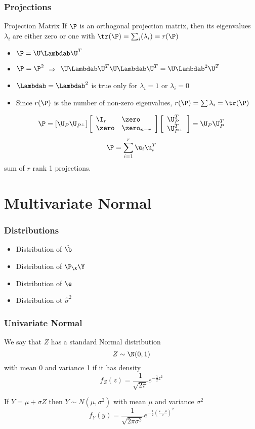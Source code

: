 \documentclass[handout]{beamer}
\begin{document}
\begin{frame}
  \frametitle{Projections}
\begin{block}{Projection Matrix}
If $\P$ is an orthogonal projection matrix, then its eigenvalues
$\lambda_i$ are
either zero or one with $\tr (\P) = \sum_i(\lambda_i) = r(\P)$
\end{block} \pause
\begin{itemize}
\item   $\P = \U \Lambdab \U^T $  \pause
\item $\P = \P^2$  $\Rightarrow$ $\U \Lambdab \U^T\U \Lambdab \U^T =
  \U\Lambdab^2\U^T$  \pause
\item $\Lambdab = \Lambdab^2$ is true only for $\lambda_i = 1$ or
  $\lambda_i =0$  \pause
\item Since $r(\P)$ is the number of non-zero eigenvalues, $r(\P) =
  \sum \lambda_i = \tr(\P)$  \pause
\end{itemize}
$$\P = \left[\U_P \U_{P^\perp} \right] 
\left[
  \begin{array}{ll}
    \I_r & \zero \\
    \zero & \zero_{n-r}
  \end{array}
\right] \left[
  \begin{array}{l}
    \U_P^T \\
\U^T_{P^\perp}
  \end{array}
\right] = \U_P \U^T_P$$
$$\P = \sum_{i=1}^r \u_i \u_i^T$$  
sum of $r$ rank 1 projections.
\end{frame}


\section{Multivariate Normal}

\begin{frame} \frametitle{Distributions}
  \begin{itemize}
  \item Distribution of $\hat{\b}$
  \item Distribution of $\P_{\X} \Y$
  \item Distribution of $\e$
  \item Distribution ot $\hat{\sigma}^2$
  \end{itemize}
\end{frame}
\begin{frame}
  \frametitle{Univariate Normal}

  \begin{definition}
  We say that $Z$ has a standard  Normal distribution  
$$Z \sim  \N(0,1)$$ with mean 0 and variance 1 if it has density \pause
$$
f_Z(z) = \frac{1}{\sqrt{2 \pi}} e^{-\frac 1 2 z^2}
$$
  \end{definition} \pause

If $Y = \mu + \sigma  Z$ then $Y \sim N(\mu, \sigma^2)$ 
with mean $\mu$ and variance $\sigma^2$  \pause
$$
f_Y(y) = \frac{1}{\sqrt{2 \pi \sigma^2}} e^{-\frac 1 2 \left(\frac{z - \mu}{\sigma}\right)^2}
$$
  
\end{frame}
\end{document}
